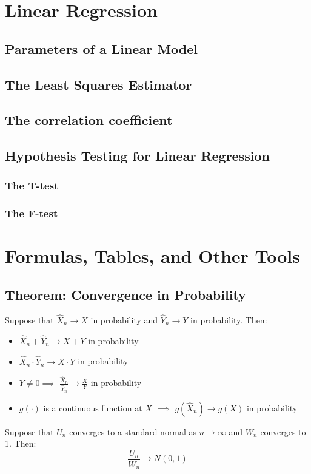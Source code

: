 \documentclass[sn-mathphys,Numbered]{sn-jnl}%
\begin{document}
\section{Linear Regression}\label{linear-regression}
\subsection{Parameters of a Linear Model}\label{linear-model}
\subsection{The Least Squares Estimator}\label{least-squares}
\subsection{The correlation coefficient}\label{correlation}
\subsection{Hypothesis Testing for Linear Regression}\label{linear-hypothesis}
\subsubsection{The T-test}\label{regression-t-test}
\subsubsection{The F-test}\label{regression-f-test}

\newpage
\section*{Formulas, Tables, and Other Tools}\label{formulas-and-tables}
\subsection*{Theorem: Convergence in Probability}
Suppose that $\hat X_n \to X$ in probability and $\hat Y_n \to Y$ in
probability. Then:
\begin{itemize}
    \item $\hat X_n + \hat Y_n \to X + Y$ in probability
    \item $\hat X_n \cdot \hat Y_n \to X \cdot Y$ in probability
    \item $Y \ne 0 \implies $ $\frac{\hat X_n}{\hat Y_n} \to \frac{X}{Y}$ in probability
    \item $g(\cdot)$ is a continuous function at $X$ $\implies$ $g(\hat X_n) \to g(X)$ in
          probability
\end{itemize}
Suppose that $U_n$ converges to a standard normal as $n \to \infty$ and $W_n$ converges to 1. Then:
\begin{equation}
    \frac{U_n}{W_n} \to N(0, 1)
\end{equation}
\end{document}
